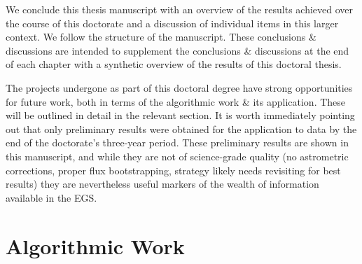 \minitoc

\pg
We conclude this thesis manuscript with an overview of the results achieved over the course of this doctorate and a discussion of individual items in this larger context. We follow the structure of the manuscript. These conclusions \& discussions are intended to supplement the conclusions \& discussions at the end of each chapter with a synthetic overview of the results of this doctoral thesis.

\pg
The projects undergone as part of this doctoral degree have strong opportunities for future work, both in terms of the algorithmic work \& its application. These will be outlined in detail in the relevant section. It is worth immediately pointing out that only preliminary results were obtained for the application to data by the end of the doctorate's three-year period. These preliminary results are shown in this manuscript, and while they are not of science-grade quality (no astrometric corrections, proper flux bootstrapping, strategy likely needs revisiting for best results) they are nevertheless useful markers of the wealth of information available in the EGS. %



\clearpage

\section{Algorithmic Work}

